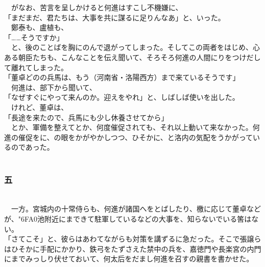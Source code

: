 \documentclass[
  paper=a5,
  fontsize=10pt,
  jafontsize=9.5pt,
  tate,                  %
  open_bracket_pos=nibu, %
]{jlreq}
\begin{document}
　がなお、苦言を呈しかけると何進はすこし不機嫌に、\\


「まだまだ、君たちは、大事を共に謀るに足りんなあ」と、いった。\\


　鄭泰も、盧植も、\\


「……そうですか」\\


　と、後のことばを胸にのんで退がってしまった。そしてこの両者をはじめ、心ある朝臣たちも、こんなことを伝え聞いて、そろそろ何進の人間にりをつけだして離れてしまった。\\


「董卓どのの兵馬は、もう（河南省・洛陽西方）まで来ているそうです」\\


　何進は、部下から聞いて、\\


「なぜすぐにやって来んのか。迎えをやれ」と、しばしば使いを出した。\\


　けれど、董卓は、\\


「長途を来たので、兵馬にも少し休養させてから」\\


　とか、軍備を整えてとか、何度催促されても、それ以上動いて来なかった。何進の催促をに、の眼をかがやかしつつ、ひそかに、と洛内の気配をうかがっているのであった。\\

\\

\subsubsection{五}

\\


　一方。宮城内の十常侍らも、何進が諸国へをとばしたり、檄に応じて董卓などが、{\char"6FA0}池附近にまできて駐軍しているなどの大事を、知らないでいる筈はない。\\


「さてこそ」と、彼らはあわてながらも対策を講ずるに急だった。そこで張譲らはひそかに手配にかかり、鉄弓をたずさえた禁中の兵を、嘉徳門や長楽宮の内門にまでみっしり伏せておいて、何太后をだまし何進を召すの親書を書かせた。\\
\end{document}

